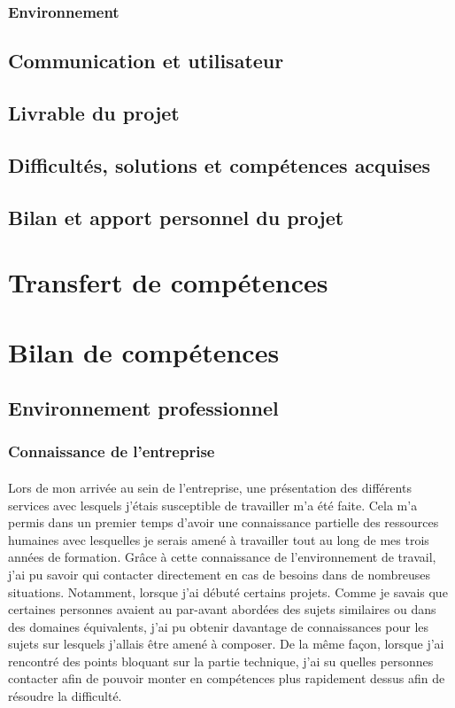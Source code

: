 \documentclass[12pt,a4paper]{report}
\begin{document}
\subsubsection{Environnement}
\subsection{Communication et utilisateur}
\subsection{Livrable du projet}
\subsection{Difficultés, solutions et compétences acquises}
\subsection{Bilan et apport personnel du projet}

\newpage
\section{Transfert de compétences}

\newpage
\section{Bilan de compétences} 
\subsection{Environnement professionnel}
\subsubsection{Connaissance de l'entreprise}
\paragraph*{}Lors de mon arrivée au sein de l'entreprise, une présentation des différents services avec lesquels j'étais susceptible de travailler m'a été faite. Cela m'a permis dans un premier temps d'avoir une connaissance partielle des ressources humaines avec lesquelles je serais amené à travailler tout au long de mes trois années de formation. Grâce à cette connaissance de l'environnement de travail, j'ai pu savoir qui contacter directement en cas de besoins dans de nombreuses situations. Notamment, lorsque j'ai débuté certains projets. Comme je savais que certaines personnes avaient au par-avant abordées des sujets similaires ou dans des domaines équivalents, j'ai pu obtenir davantage de connaissances pour les sujets sur lesquels j'allais être amené à composer. De la même façon, lorsque j'ai rencontré des points bloquant sur la partie technique, j'ai su quelles personnes contacter afin de pouvoir monter en compétences plus rapidement dessus afin de résoudre la difficulté.
\end{document}
